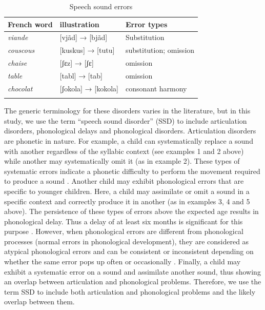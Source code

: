 \documentclass[output=paper,newtxmath,modfonts,nonflat,draftmode]{langsci/langscibook}
\begin{document}
\begin{table}
\caption{Speech sound errors\label{tab:takam:0}}
\begin{tabularx}{\textwidth}{XXX}
\lsptoprule
{French} {word}  & {illustration} & {Error} {types}\\
\midrule
\textit{viande}  & [vjãd] → [bjãd] & Substitution \\
\textit{couscous}  & [kuskus] → [tutu] & substitution; omission\\
\textit{chaise}  & [ʃɛz] → [ʃɛ] & omission\\
\textit{table}  & [tabl] → [tab] & omission\\
\textit{chocolat}  & [ʃokola] → [kokola] & consonant harmony\\
\lspbottomrule
\end{tabularx}
\end{table}


The generic terminology for these disorders varies in the literature, but in this study, we use the term “speech sound disorder” (SSD) to include articulation disorders, phonological delays and phonological disorders. Articulation disorders are phonetic in nature. For example, a child can systematically replace a sound with another regardless of the syllabic context (see examples 1 and 2 above) while another may systematically omit it (as in example 2). These types of systematic errors indicate a phonetic difficulty to perform the movement required to produce a sound \citep{Fox2001}. Another child may exhibit phonological errors that are specific to younger children. Here, a child may assimilate or omit a sound in a specific context and correctly produce it in another (as in examples 3, 4 and 5 above). The persistence of these types of errors above the expected age results in phonological delay. Thus a delay of at least six months is significant for this purpose \citep{Dodd2013}. %
However, when phonological errors are different from phonological processes (normal errors in phonological development), they are considered as atypical phonological errors and can be consistent or inconsistent depending on whether the same error pops up often or occasionally \citep{Dodd2013}. Finally, a child may exhibit a systematic error on a sound and assimilate another sound, thus showing an overlap between articulation and phonological problems. Therefore, we use the term SSD to include both articulation and phonological problems and the likely overlap between them.
\end{document}
